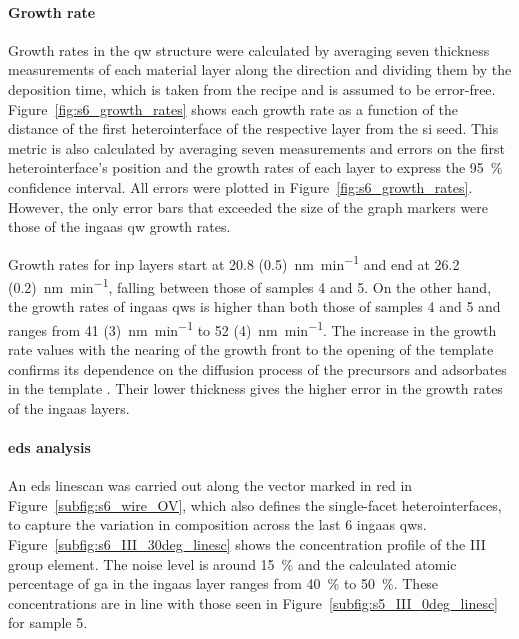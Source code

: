 \paragraph{Growth rate} Growth rates in the \acl{qw} structure were calculated by averaging seven thickness measurements of each material layer along the  direction and dividing them by the deposition time, which is taken from the recipe and is assumed to be error-free. Figure~\ref{fig:s6_growth_rates} shows each growth rate as a function of the distance of the first heterointerface of the respective layer from the \acs{si} seed. This metric is also calculated by averaging seven measurements and errors on the first heterointerface's position and the growth rates of each layer to express the \qty{95}{\%} confidence interval. All errors were plotted in Figure~\ref{fig:s6_growth_rates}. However, the only error bars that exceeded the size of the graph markers were those of the \acs{ingaas} \acl{qw} growth rates.

Growth rates for \acs{inp} layers start at \qty[separate-uncertainty=true]{20.8 (0.5)}{\nano\metre\per\minute} and end at \qty[separate-uncertainty=true]{26.2 (0.2)}{\nano\metre\per\minute}, falling between those of samples 4 and 5. On the other hand, the growth rates of \acs{ingaas} \acl{qw}s is higher than both those of samples 4 and 5 and ranges from \qty[separate-uncertainty=true]{41 (3)}{\nano\metre\per\minute} to \qty[separate-uncertainty=true]{52 (4)} {\nano\metre\per\minute}. The increase in the growth rate values with the nearing of the growth front to the opening of the template confirms its dependence on the diffusion process of the precursors and adsorbates in the template \cite{bjork2012}. Their lower thickness gives the higher error in the growth rates of the \acs{ingaas} layers.

\paragraph{\acs{eds} analysis} An \acs{eds} linescan was carried out along the  vector marked in red in Figure~\ref{subfig:s6_wire_OV}, which also defines the  single-facet heterointerfaces, to capture the variation in composition across the last \num{6} \acs{ingaas} \acl{qw}s. Figure~\ref{subfig:s6_III_30deg_linesc} shows the concentration profile of the III group element. The noise level is around \qty{15}{\%} and the calculated atomic percentage of \acl{ga} in the \acs{ingaas} layer ranges from \qty{40}{\%} to \qty{50}{\%}. These concentrations are in line with those seen in Figure~\ref{subfig:s5_III_0deg_linesc} for sample 5.

